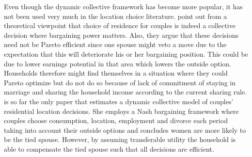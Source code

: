  Even though the dynamic collective framework has become more popular, it has not been used very much in the location choice literature. \cite{LundbergPollak2003} point out from a theoretical viewpoint that choice of residence for couples is indeed a collective decision where bargaining power matters. Also, they argue that these decisions need not be Pareto efficient since one spouse might veto a move due to the expectation that this will deteriorate his or her bargaining position. This could be due to lower earnings potential in that area which lowers the outside option. Households therefore might find themselves in a situation where they could Pareto optimize but do not do so because of lack of commitment of staying in marriage and sharing the household income according to the current sharing rule. \cite{Gemici2011} is so far the only paper that estimates a dynamic collective model of couples' residential location decisions. She employs a Nash bargaining framework where couples choose consumption, location, employment and divorce each period taking into account their outside options and concludes women are more likely to be the tied spouse. However, by assuming transferable utility the household is able to compensate the tied spouse such that all decisions are efficient. 
